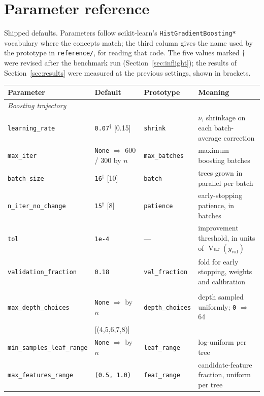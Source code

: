 \documentclass[11pt,a4paper]{article}
\newcommand{\code}[1]{\texttt{\small #1}}
\DeclareMathOperator{\Var}{Var}
\theoremstyle{definition}
\begin{document}
\appendix

\section{Parameter reference}\label{app:params}

Shipped defaults. Parameters follow scikit-learn's
\code{HistGradientBoosting*} vocabulary where the concepts match; the third
column gives the name used by the prototype in \code{reference/}, for reading
that code. The five values marked $\dagger$ were revised after the benchmark run
(Section~\ref{sec:inflight}); the results of Section~\ref{sec:results} were
measured at the previous settings, shown in brackets.

\begin{center}
\footnotesize
\setlength{\tabcolsep}{3pt}
\begin{tabular}{lllp{}}
\toprule
Parameter & Default & Prototype & Meaning \\
\midrule
\multicolumn{4}{l}{\emph{Boosting trajectory}} \\
\code{learning\_rate} & \code{0.07}$^\dagger$ \small[0.15] & \code{shrink} & $\nu$, shrinkage on each batch-average correction \\
\code{max\_iter} & \code{None} $\Rightarrow$ 600 / 300 by $n$ & \code{max\_batches} & maximum boosting batches \\
\code{batch\_size} & \code{16}$^\dagger$ \small[10] & \code{batch} & trees grown in parallel per batch \\
\code{n\_iter\_no\_change} & \code{15}$^\dagger$ \small[8] & \code{patience} & early-stopping patience, in batches \\
\code{tol} & \code{1e-4} & --- & improvement threshold, in units of $\Var(y_{\text{val}})$ \\
\code{validation\_fraction} & \code{0.18} & \code{val\_fraction} & fold for early stopping, weights and calibration \\
\addlinespace
\multicolumn{4}{l}{\emph{Per-tree randomization}} \\
\code{max\_depth\_choices} & \code{None} $\Rightarrow$ by $n$ & \code{depth\_choices} & depth sampled uniformly; \code{0} $\Rightarrow$ 64 \\
& \small[(4,5,6,7,8)] & & \\
\code{min\_samples\_leaf\_range} & \code{None} $\Rightarrow$ by $n$ & \code{leaf\_range} & log-uniform per tree \\
\code{max\_features\_range} & \code{(0.5, 1.0)} & \code{feat\_range} & candidate-feature fraction, uniform per tree \\

\end{tabular}
\end{center}
\end{document}

